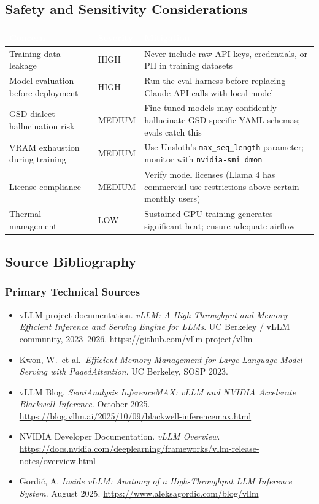 \documentclass[11pt,letterpaper]{article}
\newcommand{\tableheader}[1]{\textbf{\sffamily\textcolor{white}{#1}}}
\begin{document}
\subsection{Safety and Sensitivity Considerations}

\begin{center}
\begin{tabularx}{\textwidth}{L{4cm}L{2cm}X}
\toprule
{}
\tableheader{Concern} & \tableheader{Severity} & \tableheader{Mitigation} \\
\midrule
Training data leakage & HIGH & Never include raw API keys, credentials, or PII in training datasets \\
Model evaluation before deployment & HIGH & Run the eval harness before replacing Claude API calls with local model \\
GSD-dialect hallucination risk & MEDIUM & Fine-tuned models may confidently hallucinate GSD-specific YAML schemas; evals catch this \\
VRAM exhaustion during training & MEDIUM & Use Unsloth's \texttt{max\_seq\_length} parameter; monitor with \texttt{nvidia-smi dmon} \\
License compliance & MEDIUM & Verify model licenses (Llama 4 has commercial use restrictions above certain monthly users) \\
Thermal management & LOW & Sustained GPU training generates significant heat; ensure adequate airflow \\
\bottomrule
\end{tabularx}
\end{center}

\subsection{Source Bibliography}

\subsubsection{Primary Technical Sources}
\begin{itemize}[leftmargin=*]
  \item vLLM project documentation. \textit{vLLM: A High-Throughput and Memory-Efficient Inference and Serving Engine for LLMs}. UC Berkeley / vLLM community, 2023--2026. \url{https://github.com/vllm-project/vllm}
  \item Kwon, W.\ et al.\ \textit{Efficient Memory Management for Large Language Model Serving with PagedAttention}. UC Berkeley, SOSP 2023.
  \item vLLM Blog. \textit{SemiAnalysis InferenceMAX: vLLM and NVIDIA Accelerate Blackwell Inference}. October 2025. \url{https://blog.vllm.ai/2025/10/09/blackwell-inferencemax.html}
  \item NVIDIA Developer Documentation. \textit{vLLM Overview}. \url{https://docs.nvidia.com/deeplearning/frameworks/vllm-release-notes/overview.html}
  \item Gordić, A. \textit{Inside vLLM: Anatomy of a High-Throughput LLM Inference System}. August 2025. \url{https://www.aleksagordic.com/blog/vllm}
\end{itemize}
\end{document}
